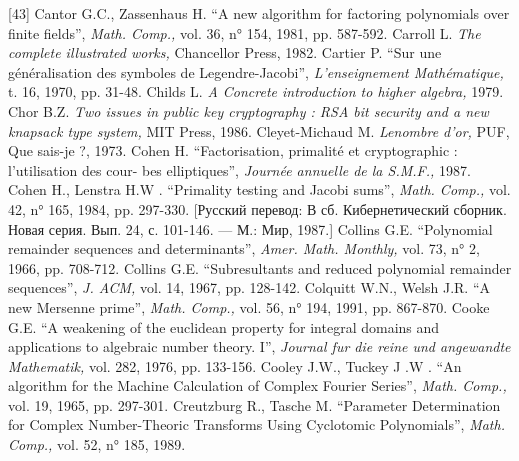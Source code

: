 \documentclass{../../template/mai_book}
\begin{document}
[43] Cantor G.C., Zassenhaus H. “A new algorithm for factoring polynomials
over finite fields”, {\itshape Math. Comp.,} vol. 36, n° 154, 1981, pp. 587-592. \newline
[44] Carroll L. {\itshape The complete illustrated works,} Chancellor Press, 1982. \newline
[45] Cartier P. “Sur une g\'{e}n\'{e}ralisation des symboles de Legendre-Jacobi”, {\itshape L’enseignement Math\'{e}matique,} t. 16, 1970, pp. 31-48. \newline
[46] Childs L. {\itshape A Concrete introduction to higher algebra,} 1979. \newline
[47] Chor B.Z. {\itshape Two issues in public key cryptography : RSA bit security and a new knapsack type system,} MIT Press, 1986. \newline
[48] Cleyet-Michaud M. {\itshape Lenombre d’or,} PUF, Que sais-je ?, 1973. \newline
[49] Cohen H. “Factorisation, primalit\'{e} et cryptographic : l’utilisation des cour- \newline bes elliptiques”, {\itshape Journ\'{e}e annuelle de la S.M.F.,} 1987. \newline
[50] Cohen H., Lenstra H.W . “Primality testing and Jacobi sums”, {\itshape Math. Comp.,} vol. 42, n° 165, 1984, pp. 297-330. [Русский перевод: В сб. Кибернетический сборник. Новая серия. Вып. 24, с. 101-146. — М.: Мир,
1987.] \newline
[51] Collins G.E. “Polynomial remainder sequences and determinants”,
{\itshape Amer. Math. Monthly,} vol. 73, n° 2, 1966, pp. 708-712. \newline
[52] Collins G.E. “Subresultants and reduced polynomial remainder sequences”, {\itshape J. ACM,} vol. 14, 1967, pp. 128-142. \newline
[53] Colquitt W.N., Welsh J.R. “A new Mersenne prime”, {\itshape Math. Comp.,} vol. 56, n° 194, 1991, pp. 867-870. \newline
[54] Cooke G.E. “A weakening of the euclidean property for integral domains and applications to algebraic number theory. I”, {\itshape Journal fur die reine und angewandte Mathematik,} vol. 282, 1976, pp. 133-156. \newline
[55] Cooley J.W., Tuckey J .W . “An algorithm for the Machine Calculation
of Complex Fourier Series”, {\itshape Math. Comp.,} vol. 19, 1965, pp. 297-301. \newline
\newpage
\noindent
[56] Creutzburg R., Tasche M. “Parameter Determination for Complex
Number-Theoric Transforms Using Cyclotomic Polynomials”, {\itshape Math. Comp.,} vol. 52, n° 185, 1989. \newline
\end{document}
